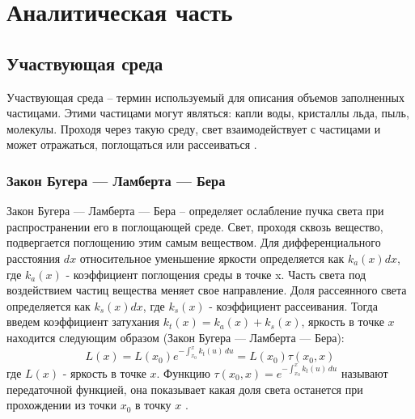 \chapter{Аналитическая часть}

\section{Участвующая среда}
\label{math}
Участвующая среда -- термин используемый для описания объемов заполненных частицами. Этими частицами могут являться: капли воды, кристаллы льда, пыль, молекулы. Проходя через такую среду, свет взаимодействует с частицами и может отражаться, поглощаться или рассеиваться \cite{frostbite}.  

\subsection{Закон Бугера — Ламберта — Бера}
Закон Бугера — Ламберта — Бера – определяет ослабление пучка света при распространении его в поглощающей среде. 
Свет, проходя сквозь вещество, подвергается поглощению этим самым веществом. Для дифференциального расстояния $ dx $ относительное уменьшение яркости определяется как $ k_a(x)dx $, где $ k_a(x) $ - коэффициент поглощения среды в точке x. Часть света под воздействием частиц вещества меняет свое направление. Доля рассеянного света определяется как $ k_s(x)dx $, где $ k_s(x) $ - коэффициент рассеивания. Тогда введем коэффициент затухания $ k_t(x)  = k_a(x) + k_s(x) $, яркость в точке $x$ находится следующим образом (Закон Бугера — Ламберта — Бера):  
\begin{equation}
	\label{beers_law}
	L(x) = L(x_0) e^{-\int_{x_0}^{x} k_t(u)\,du}=L(x_0)\tau(x_0, x) 
\end{equation}
где $ L(x) $ - яркость в точке $ x $. Функцию $ \tau(x_0, x) = e^{-\int_{x_0}^{x} k_t(u)\,du}  $ называют передаточной функцией, она показывает какая доля света останется при прохождении из точки $ x_0 $ в точку $ x $ \cite{partmedia}.

